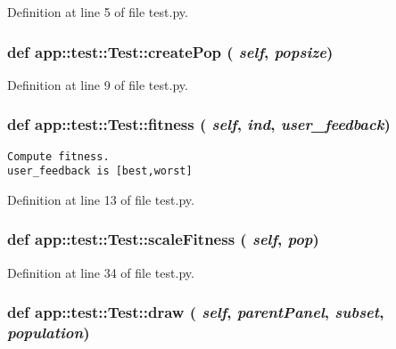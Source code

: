 Definition at line 5 of file test.py.
\subsubsection{\setlength{\rightskip}{0pt plus 5cm}def app::test::Test::createPop ( {\em self},  {\em popsize})}\label{classapp_1_1test_1_1Test_310793dbcd9e3c8f6403c332b69eea4b}




Definition at line 9 of file test.py.
\subsubsection{\setlength{\rightskip}{0pt plus 5cm}def app::test::Test::fitness ( {\em self},  {\em ind},  {\em user\_\-feedback})}\label{classapp_1_1test_1_1Test_19e33748e3d0bb6f3ae2ea0e71ebca2e}




\footnotesize\begin{verbatim}
Compute fitness.
user_feedback is [best,worst]
\end{verbatim}
\normalsize
 

Definition at line 13 of file test.py.
\subsubsection{\setlength{\rightskip}{0pt plus 5cm}def app::test::Test::scaleFitness ( {\em self},  {\em pop})}\label{classapp_1_1test_1_1Test_c67e0faf129ddb65c45bc4f0c3df53af}




Definition at line 34 of file test.py.
\subsubsection{\setlength{\rightskip}{0pt plus 5cm}def app::test::Test::draw ( {\em self},  {\em parentPanel},  {\em subset},  {\em population})}\label{classapp_1_1test_1_1Test_5e996b0e880d64cba1f5d083169c65e0}




